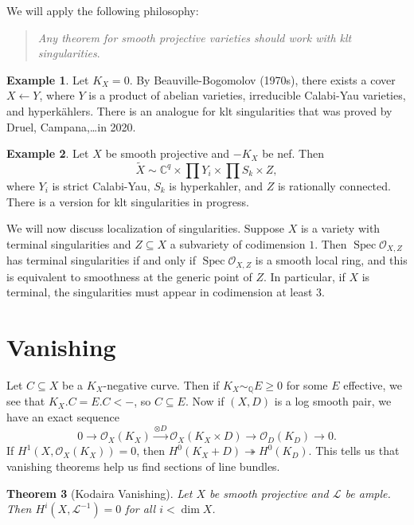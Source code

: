 \documentclass[leqno, openany]{memoir}
\newtheorem{thm}{Theorem}[section]
\theoremstyle{definition}
\newtheorem{exm}[thm]{Example}
\theoremstyle{remark}
\theoremstyle{plain}
\theoremstyle{definition}
\theoremstyle{remark}
\newcommand{\C}{\mathbb{C}}
\newcommand{\Q}{\mathbb{Q}}
\newcommand{\msc}[1]{\mathscr{#1}}
\newcommand{\wt}[1]{\widetilde{#1}}
\DeclareMathOperator{\Spec}{Spec}
\begin{document}
We will apply the following philosophy: 
\begin{quotation}
    \textit{Any theorem for smooth projective varieties should work with klt singularities}. 
\end{quotation}

\begin{exm}
    Let $K_X = 0$. By Beauville-Bogomolov (1970s), there exists a cover $X \gets Y$, where $Y$ is a product of abelian varieties, irreducible Calabi-Yau varieties, and hyperk\"ahlers. There is an analogue for klt singularities that was proved by Druel, Campana,\ldots in 2020.
\end{exm}

\begin{exm}
    Let $X$ be smooth projective and $-K_X$ be nef. Then 
    \[ \wt{X} \sim \C^q \times \prod Y_i \times \prod S_k \times Z, \]
    where $Y_i$ is strict Calabi-Yau, $S_k$ is hyperkahler, and $Z$ is rationally connected. There is a version for klt singularities in progress.
\end{exm}

We will now discuss localization of singularities. Suppose $X$ is a variety with terminal singularities and $Z \subseteq X$ a subvariety of codimension $1$. Then $\Spec \msc{O}_{X,Z}$ has terminal singularities if and only if $\Spec \msc{O}_{X,Z}$ is a smooth local ring, and this is equivalent to smoothness at the generic point of $Z$. In particular, if $X$ is terminal, the singularities must appear in codimension at least $3$.

\section{Vanishing}%
\label{sec:vanishing}

Let $C \subseteq X$ be a $K_X$-negative curve. Then if $K_X \sim_{\Q} E \geq 0$ for some $E$ effective, we see that $K_X.C = E.C < -$, so $C \subseteq E$. Now if $(X, D)$ is a log smooth pair, we have an exact sequence
\[ 0 \to \msc{O}_X(K_X) \xrightarrow{\otimes D} \msc{O}_X (K_X \times D) \to \msc{O}_D(K_D) \to 0. \]
If $H^1(X, \msc{O}_X(K_X)) = 0$, then $H^0(K_X + D) \twoheadrightarrow H^0(K_D)$. This tells us that vanishing theorems help us find sections of line bundles.

\begin{thm}[Kodaira Vanishing]
    Let $X$ be smooth projective and $\msc{L}$ be ample. Then $H^i(X, \msc{L}^{-1}) = 0$ for all $i < \dim X$.
\end{thm}
\end{document}
